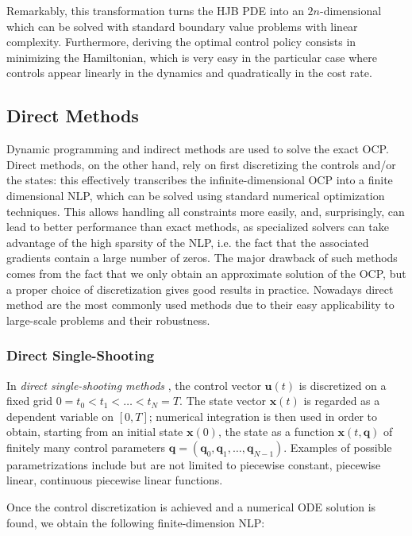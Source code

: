 Remarkably, this transformation turns the HJB PDE into an
$2n$-dimensional which can be solved with standard boundary value
problems with linear complexity. Furthermore, deriving the optimal
control policy consists in minimizing the Hamiltonian, which is very
easy in the particular case where controls appear linearly in the
dynamics and quadratically in the cost rate.

\subsection{Direct Methods}
\label{subsec:chap3-direct-methods}

Dynamic programming and indirect methods are used to solve the exact
OCP. Direct methods, on the other hand, rely on first discretizing the
controls and/or the states: this effectively transcribes the
infinite-dimensional OCP into a finite dimensional NLP, which can be
solved using standard numerical optimization techniques. This allows
handling all constraints more easily, and, surprisingly, can lead to
better performance than exact methods, as specialized solvers can take
advantage of the high sparsity of the NLP, i.e. the fact that the
associated gradients contain a large number of zeros. The major
drawback of such methods comes from the fact that we only obtain an
approximate solution of the OCP, but a proper choice of discretization
gives good results in practice. Nowadays direct method are the most
commonly used methods due to their easy applicability to large-scale
problems and their robustness.

\subsubsection{Direct Single-Shooting}

In \emph{direct single-shooting methods}
\cite{hicks1971approximation,sargent1978development}, the control
vector $\mathbf{u}(t)$ is discretized on a fixed grid
$0=t_0<t_1<\ldots<t_N=T$. The state vector $\mathbf{x}(t)$ is regarded
as a dependent variable on $[0,T]$; numerical integration is then used
in order to obtain, starting from an initial state $\mathbf{x}(0)$,
the state as a function $\mathbf{x}(t,\mathbf{q})$ of finitely many
control parameters
$\mathbf{q}=(\mathbf{q}_0,\mathbf{q}_1,\ldots,\mathbf{q}_{N-1})$. Examples
of possible parametrizations include but are not limited to piecewise
constant, piecewise linear, continuous piecewise linear functions.

Once the control discretization is achieved and a numerical ODE
solution is found, we obtain the following finite-dimension NLP:

